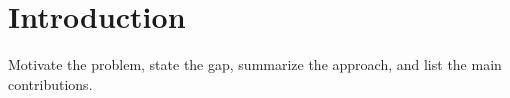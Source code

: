\section{Introduction}

Motivate the problem, state the gap, summarize the approach, and list the main
contributions.
